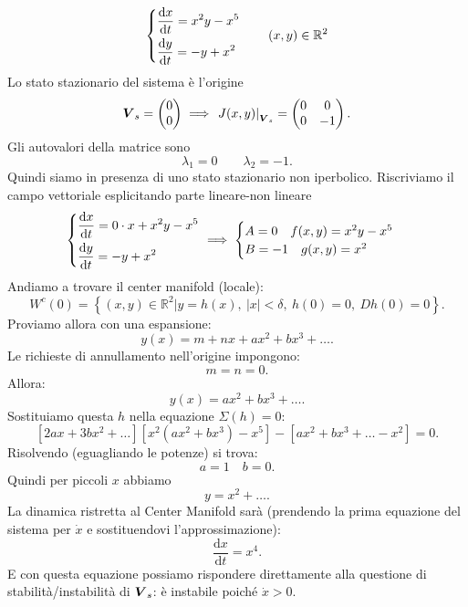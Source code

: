 \begin{exmp}[]
    \[
    \begin{dcases}
    \frac{\text{d} x}{\text{d} t} = x^2y-x^5\\
    \frac{\text{d} y}{\text{d} t} = -y + x^2
    \end{dcases}
    \qquad 
    (x, y) \in \mathbb{R}^2
    \]
    Lo stato stazionario del sistema è l'origine
    \[
        \boldsymbol{V}_s = \begin{pmatrix} 0 \\ 0 \end{pmatrix} \implies  
	\left.J(x, y)\right|_{\boldsymbol{V}_s} = 
	   \begin{pmatrix}
	       0 & 0 \\
	       0 & -1 \\
	   \end{pmatrix}
    .\] 
    Gli autovalori della matrice sono 
    \[
        \lambda_1=0 \qquad  \lambda_2=-1
    .\] 
    Quindi siamo in presenza di uno stato stazionario non iperbolico. Riscriviamo il campo vettoriale esplicitando parte lineare-non lineare
    \[
    \begin{dcases}
    \frac{\text{d} x}{\text{d} t} = 0\cdot x+ x^2y-x^5\\
    \frac{\text{d} y}{\text{d} t} = -y + x^2
    \end{dcases}
    \implies 
    \begin{cases}
	A = 0 \quad  f(x, y) = x^2y-x^5\\
	B = -1 \quad  g(x, y) = x^2
    \end{cases}
    \]
    Andiamo a trovare il center manifold (locale):
    \[
	W^c(0) = \left\{(x, y) \in \mathbb{R}^2  | y = h(x), \ \left|x\right|<\delta, \ h(0) = 0, \ Dh(0) = 0\right\}
    .\] 
    Proviamo allora con una espansione:
    \[
	y(x) = m + nx + ax^2 + bx^3 + \ldots
    .\] 
    Le richieste di annullamento nell'origine impongono:
    \[
        m = n = 0
    .\] 
    Allora:
    \[
	y(x) = ax^2+bx^3 + \ldots
    .\]
    Sostituiamo questa $h$  nella equazione $\Sigma (h)=0$:
    \[
        \left[2ax+3bx^2 + \ldots\right]\left[x^2\left(ax^2+bx^3\right)-x^5\right]-
	\left[ax^2+bx^3 + \ldots - x^2\right] = 0
    .\] 
    Risolvendo (eguagliando le potenze) si trova:
    \[
        a = 1 \quad  b = 0
    .\] 
    Quindi per piccoli $x$  abbiamo 
    \[
	y = x^2 + \ldots
    .\] 
    La dinamica ristretta al Center Manifold sarà (prendendo la prima equazione del sistema per $\dot{x}$ e sostituendovi l'approssimazione):
    \[
        \frac{\text{d} x}{\text{d} t} = x^4
    .\] 
    E con questa equazione possiamo rispondere direttamente alla questione di stabilità/instabilità di $\boldsymbol{V}_s$: è instabile poiché $\dot{x}> 0$.
\end{exmp}
\noindent

